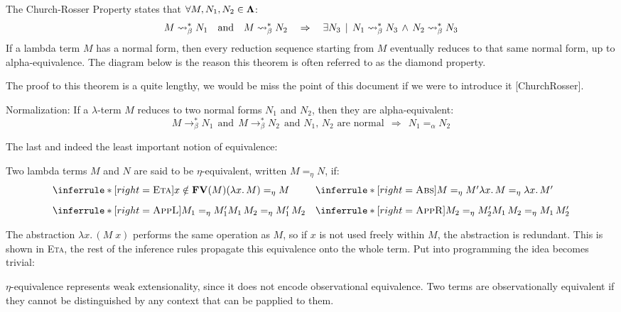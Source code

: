 \begin{theorem} The Church-Rosser Property states that $\forall M, N_1, N_2 \in \mathbf{\Lambda}$:
  \[
    M \mathrel{\leadsto}_\beta^* N_1 \quad \text{and} \quad M \mathrel{\leadsto}_\beta^* N_2 \quad \Rightarrow \quad \exists N_3 \, \mid \, N_1 \mathrel{\leadsto}_\beta^* N_3 \,\wedge\, N_2 \mathrel{\leadsto}_\beta^* N_3
  \]
  If a lambda term $M$ has a normal form, then every reduction sequence starting from $M$ eventually reduces to that same normal form, up to alpha-equivalence. The diagram below is the reason this theorem is often referred to as the diamond property.
\begin{center}
\end{center}
The proof to this theorem is a quite lengthy, we would be miss the point
of this document if we were to introduce it [ChurchRosser].
\end{theorem}
\begin{corollary} Normalization: If a $\lambda$-term $M$ reduces to two normal forms $N_1$ and $N_2$, then they are alpha-equivalent:
\[
M \to_\beta^* N_1 \ \ \text{and} \ \ M \to_\beta^* N_2 \ \ \text{and $N_1$, $N_2$ are normal} \ \ \Rightarrow \ \ N_1 =_\alpha N_2
\]
\end{corollary}
The last and indeed the least important notion of equivalence:
\begin{definition} Two lambda terms \( M \) and \( N \) are said to be $\eta$-equivalent, written \( M =_\eta N \), if:
  \[
\begin{array}{@{}l@{\quad}l@{}}
  \inferrule*[right=\textsc{Eta}]
  { x \notin \FV M }
  { (\lam{x}{M}) =_\eta M   }
  &
  \inferrule*[right=\textsc{Abs}]
    { M =_\eta M' }
    { \lam{x}{M} =_\eta \lam{x}{M'} } \\[2ex]
  \inferrule*[right=\textsc{AppL}]
    { M_1 =_\eta M_1' }
    { M_1\,M_2 =_\eta M_1'\,M_2 }
  &
  \inferrule*[right=\textsc{AppR}]
    { M_2 =_\eta M_2' }
    { M_1\,M_2 =_\eta M_1\,M_2' }
\end{array}
\]

The abstraction \( \lambda x.\, (M\;x) \) performs the same operation as \( M \), so if \( x \) is not used freely within \( M \), the abstraction is redundant. This is shown in \textsc{Eta}, the rest of the inference rules propagate this equivalence onto the whole term. Put into programming the idea becomes trivial: 

\end{definition}
$\eta$-equivalence represents weak extensionality, since it does not encode observational equivalence. Two terms are observationally equivalent if they cannot be distinguished by any context that can be papplied to them.

